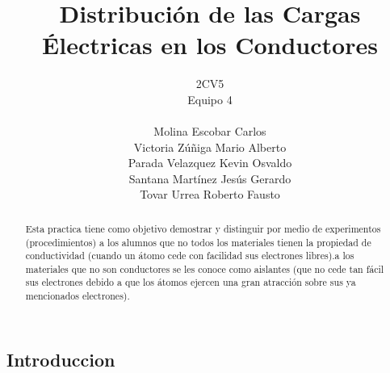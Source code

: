 \documentclass[11pt]{article}
\title{Distribución de las Cargas Électricas en los Conductores}
\author{2CV5\\Equipo 4\\\\Molina Escobar Carlos\\Victoria Zúñiga Mario Alberto\\Parada Velazquez Kevin Osvaldo\\Santana Martínez Jesús Gerardo\\Tovar Urrea Roberto Fausto}
\date{}
\begin{document}
	
\maketitle

\begin{abstract}
	Esta practica tiene como objetivo  demostrar y distinguir  por medio de experimentos (procedimientos) a los alumnos que no todos los materiales tienen la propiedad de conductividad (cuando un átomo cede con facilidad sus electrones libres).a los materiales que no son conductores se les conoce como aislantes (que no cede tan fácil sus electrones debido a que los átomos ejercen una gran atracción sobre sus ya mencionados electrones).
\end{abstract}


\begin{multicols}{2}
\section{Introduccion}

\end{multicols}
\end{document}
